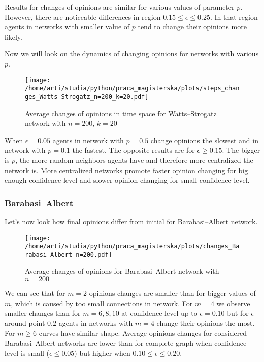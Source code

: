 \documentclass{article}
\begin{document}
Results for changes of opinions are similar for various values of parameter $p$. However, there are noticeable differences in region $0.15 \leq \epsilon \leq 0.25$. In that region agents in networks with smaller value of $p$ tend to change their opinions more likely.

\indent

Now we will look on the dynamics of changing opinions for networks with various $p$.


\begin{figure}[H]
		\centering
		\texttt{[image: /home/arti/studia/python/praca\_magisterska/plots/steps\_changes\_Watts-Strogatz\_n=200\_k=20.pdf]}
		\caption{Average changes of opinions in time space for Watts--Strogatz network with $n=200$, $k=20$}
\end{figure}

When $\epsilon=0.05$ agents in network with $p=0.5$ change opinions the slowest and in network with $p=0.1$ the fastest. The opposite results are for $\epsilon \geq 0.15$. The bigger is $p$, the more random neighbors agents have and therefore more centralized the network is. More centralized networks promote faster opinion changing for big enough confidence level and slower opinion changing for small confidence level.

\subsubsection{Barabasi--Albert}

Let's now look how final opinions differ from initial for Barabasi--Albert network.

\begin{figure}[H]
		\centering
		\texttt{[image: /home/arti/studia/python/praca\_magisterska/plots/changes\_Barabasi-Albert\_n=200.pdf]}
		\caption{Average changes of opinions for Barabasi--Albert network with $n=200$}
\end{figure}

We can see that for $m=2$ opinions changes are smaller than for bigger values of $m$, which is caused by too small connections in network. For $m=4$ we observe smaller changes than for $m=6,8,10$ at confidence level up to $\epsilon=0.10$ but for $\epsilon$ around point $0.2$ agents in networks with $m=4$ change their opinions the most. For $m \geq 6$ curves have similar shape. Average opinions changes for considered Barabasi--Albert networks are lower than for complete graph when confidence level is small ($\epsilon \leq 0.05$) but higher when $0.10 \leq \epsilon \leq 0.20$.
\end{document}

